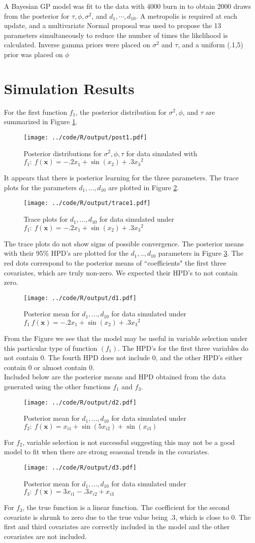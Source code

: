 \documentclass[11pt]{article}
\def\beginmyfig{\begin{figure}[H]\center} %
\def\endmyfig{\end{figure}}
\begin{document}
A Bayesian GP model was fit to the data with 4000 burn in to obtain 2000 draws
from the posterior for $\tau,\phi,\sigma^2$, and $d_1,\cdots,d_{10}$. A metropolis
is required at each update, and a multivariate Normal proposal was used to propose
the 13 parameters simultaneously to reduce the number of times the likelihood is 
calculated. Inverse gamma priors were placed on $\sigma^2$ and $\tau$, and a uniform 
(.1,5) prior was placed on $\phi$ 

\section{Simulation Results}
For the first function $f_1$, the posterior distribution for $\sigma^2, \phi$, and $\tau$
are summarized in Figure \ref{fig:par1}.
\beginmyfig 
  \texttt{[image: ../code/R/output/post1.pdf]} 
  \caption{Posterior distributions for $\sigma^2,\phi,\tau$ for data simulated
  with $f_1:~f(\bm x) = -.2x_1 + \sin(x_2) + .3{x_3}^2$}
  \label{fig:par1}
\endmyfig 
It appears that there is posterior learning for the three parameters. 
The trace plots for the parameters $d_1,...,d_{10}$ are plotted in 
Figure \ref{fig:trace1}. 
\beginmyfig 
  \texttt{[image: ../code/R/output/trace1.pdf]} 
  \caption{Trace plots for $d_1,...,d_{10}$ for data simulated under $f_1:
  ~f(\bm x) = -.2x_1 + \sin(x_2) + .3{x_3}^2$}
  \label{fig:trace1}
\endmyfig 
The trace plots do not show signs of possible convergence. The posterior means
with their 95\% HPD's are plotted for the $d_1,..,d_{10}$ parameters in Figure
\ref{fig:postmean1}. The red dots correspond to the posterior means of
``coefficients" the first three covariates, which are truly non-zero. We
expected their HPD's to not contain zero.
\beginmyfig 
  \texttt{[image: ../code/R/output/d1.pdf]} 
  \caption{Posterior mean for $d_1,...,d_{10}$ for data simulated under
  $f_1~f(\bm x) = -.2x_1 + \sin(x_2) + .3{x_3}^2$}
  \label{fig:postmean1}
\endmyfig 
From the Figure we see that the model may be useful in variable selection
under this particular type of function $(f_1)$. The HPD's for the first 
three variables do not contain 0. The fourth HPD does not include 0, and 
the other HPD's either contain 0 or almost contain 0.\\

Included below are the posterior means and HPD obtained from
the data generated using the other functions $f_1$ and $f_3$.
\beginmyfig 
  \texttt{[image: ../code/R/output/d2.pdf]} 
  \caption{Posterior mean for $d_1,...,d_{10}$ for data simulated under
$f_2:~f(\bm x) = x_{i1} + \sin(5x_{i2}) + \sin(x_{i3})$}
\endmyfig 
For $f_2$, variable selection is not successful suggesting this may 
not be a good model to fit when there are strong seasonal trends in the
covariates.
\beginmyfig 
  \texttt{[image: ../code/R/output/d3.pdf]} 
  \caption{Posterior mean for $d_1,...,d_{10}$ for data simulated under
$f_3:~f(\bm x) = 3x_{i1} - .3x_{i2} + x_{i3} $}
\endmyfig 
For $f_3$, the true function is a linear function. The coefficient for the
second covariate is shrunk to zero due to the true value being $.3$, which is
close to 0. The first and third covariates are correctly included in the model
and the other covariates are not included.
\end{document}
